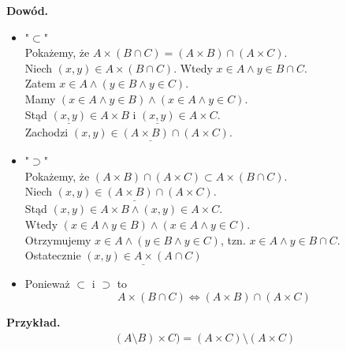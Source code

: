 \documentclass[a5paper,8pt]{article}
\theoremstyle{mythmstyle}
\begin{document}
            \textbf{Dowód.}
            \begin{itemize}
                \item "$ \subset $" \\
                    Pokażemy, że $ A \times (B \cap C) = (A \times B) \cap (A \times C) $. \\
                    Niech $ (x, y) \in A \times (B \cap C) $. Wtedy $ x \in A \wedge y \in B \cap C $. \\
                    Zatem $ x \in A \wedge (y \in B \wedge y \in C) $. \\
                    Mamy $ (x \in A \wedge y \in B) \wedge (x \in A \wedge y \in C) $. \\
                    Stąd $ \underline{(x, y)} \in A \times B $ i $ \underline{(x, y)} \in A \times C $. \\
                    Zachodzi $ \underline{(x, y) \in (A \times B) \cap (A \times C)} $.

                \item "$ \supset $" \\
                    Pokażemy, że $ (A \times B) \cap (A \times C) \subset A \times (B \cap C) $. \\
                    Niech $ \underline{(x, y) \in (A \times B) \cap (A \times C)} $. \\
                    Stąd $ (x, y) \in A \times B \wedge (x, y) \in A \times C $. \\
                    Wtedy $ (x \in A \wedge y \in B) \wedge (x \in A \wedge y \in C) $. \\
                    Otrzymujemy $ x \in A \wedge (y \in B \wedge y \in C) $, tzn.
                    $ x \in A \wedge y \in B \cap C $. \\
                    Ostatecznie $ \underline{(x, y) \in A \times (A \cap C)} $

                \item Ponieważ $ \subset $ i $ \supset $ to
                    \begin{equation*}
                        A \times (B \cap C) \iff (A \times B) \cap (A \times C)
                    \end{equation*}
            \end{itemize}

            \pagebreak
            \textbf{Przykład.}
            \begin{align*}
                (A \setminus B) \times C) = (A \times C) \setminus (A \times C)\\
            \end{align*}
\end{document}
